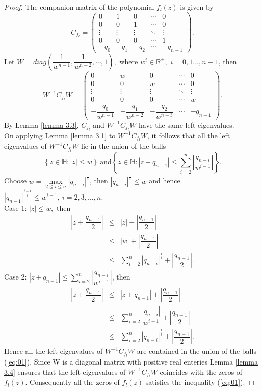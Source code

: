\documentclass [12pt]{article}
\begin{document}
\begin{proof}
	The companion matrix of the polynomial $f_l(z)$ is given by 
	\[
	C_{f_l} = 
	\begin{pmatrix}
		0 & 1 & 0 & \cdots & 0 \\
		0 & 0 & 1 & \cdots & 0 \\
		\vdots & \vdots & \vdots & \ddots & \vdots \\
		0 & 0 & 0 & \cdots & 1 \\
		-q_0 & -q_1 & -q_2 & \cdots & -q_{n-1}
	\end{pmatrix}.
	\]
	Let $W=diag\left(\dfrac{1}{w^{n-1}},\dfrac{1}{w^{n-2}},\cdots,1\right),$ where $w^{i} \in \mathbb{R}^+,$ $i=0,1\dots,n-1$, then 
	\[
	W^{-1} C_{f_l} W = 
	\begin{pmatrix}
		0 & w & 0 & \cdots & 0 \\
		0 & 0 & w & \cdots & 0 \\
		\vdots & \vdots & \vdots & \ddots & \vdots \\
		0 & 0 & 0 & \cdots & w \\
		-\dfrac{q_0}{w^{n-1}}  & -\dfrac{q_1}{w^{n-2}}& -\dfrac{q_2}{w^{n-3}} & \cdots & -q_{n-1}
	\end{pmatrix}.
	\]
	By Lemma \ref{lemma 3.3},  $C_{f_l}$  and  $W^{-1} C_{f_l} W$ have the same left eigenvalues.\\
	On applying Lemma \ref{lemma 3.1} to $W^{-1} C_{f_l} W$, it follows that all the left eigenvalues of $W^{-1} C_{f_l} W$ lie in the union of the balls 
	$$ \left\{z\in\mathbb{H}:|z|\le w\right\}~\mbox{and} \left\{z\in\mathbb{H}:|z+q_{n-1}|\le \sum_{i=2}^{n}\left|\dfrac{q_{n-i}}{w^{i-1}}\right|\right\}.$$ 
	Choose $w=\max\limits_{2\le i\le n} |q_{n-i}|^\frac{1}{i}$, then $ |q_{n-i}|^\frac{1}{i}\le w$ and hence $|q_{n-1}|^\frac{i-1}{i}\le w^{i-1},~i=2,3,\dots,n$. \\
	Case 1: $|z|\le w,$ then
	\begin{eqnarray*}
		\left|z+\dfrac{q_{n-1}}{2}\right|&\le& |z|+\left|\dfrac{q_{n-1}}{2}\right|\\&\le& |w|+ \left|\dfrac{q_{n-1}}{2}\right|\\&\le&\sum\limits_{i=2}^{n}|q_{n-i}|^\frac{1}{i}+\left|\dfrac{q_{n-1}}{2}\right|.
	\end{eqnarray*}
	Case 2: $|z+q_{n-1}|\le \sum_{i=2}^{n}\left|\dfrac{q_{n-i}}{w^{i-1}}\right|$, then
	\begin{eqnarray*}
		\left|z+\dfrac{q_{n-1}}{2}\right|&\le& |z+q_{n-1}|+\left|\dfrac{q_{n-1}}{2}\right|\\ &\le&\sum_{i=2}^{n}\dfrac{|q_{n-i}|}{w^{i-1}}+\left|\dfrac{q_{n-1}}{2}\right|\\&\le& \sum\limits_{i=2}^{n}|q_{n-i}|^\frac{1}{i}+\left|\dfrac{q_{n-1}}{2}\right|.
	\end{eqnarray*}
	Hence all the left eigenvalues of $W^{-1} C_{f_l} W$ are contained in the union of the balls (\ref{eq:01}). Since W is a diagonal matrix with positive real enteries Lemma \ref{lemma 3.4} ensures that the left eigenvalues of $W^{-1} C_{f_l} W$ coincides with the zeros of $f_l(z)$. Consequently all the zeros of $f_l(z)$ satisfies the inequality (\ref{eq:01}). 
	

\end{proof}
\end{document}
